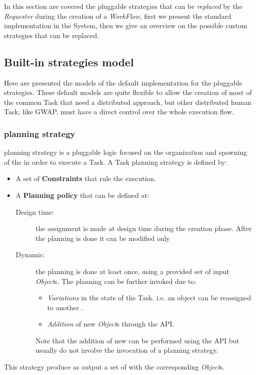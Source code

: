 
In this section are covered the pluggable strategies that can be \emph{replaced}
by the \emph{Requester} during the creation of a \emph{WorkFlow}, first we
present the standard implementation in the System, then we give an overview on
the possible custom strategies that can be replaced.



\subsection{Built-in strategies model}
Here are presented the models of the default implementation for the pluggable
strategies. These default models are quite flexible to allow the creation of
most of the common Task that need a distributed approach, but other distributed
human Task, like \ac{GWAP}, must have a direct control over the whole execution
flow.


\subsubsection{\utask{} planning strategy}
\utask{} planning strategy is a pluggable logic focused on the organization and
spawning of the \utask{} in order to execute a Task. A Task planning strategy is
defined by:
\begin{itemize}
    \item A set of \textbf{Constraints} that rule the execution.

    \item A \textbf{Planning policy} that can be defined at:
        \begin{description}
            \item[Design time:] the assignment is made at design time during the
            creation phase. After the planning is done it can be modified only

            \item[Dynamic:] the planning is done at least once, using a provided
            set of input \emph{Object}s. The planning can be further invoked due
            to:
            \begin{itemize}
                \item \emph{Variations} in the state of the Task. i.e. an object
                can be reassigned to another \utask{}.

                \item \emph{Addition} of new \emph{Object}s through the API.
            \end{itemize}
            Note that the addition of new \utask{} can be performed using the
            API but usually do not involve the invocation of a \utask{} planning
            strategy.
        \end{description}
\end{itemize}
This strategy produce as output a set of \utask{} with the corresponding
\emph{Object}s.



